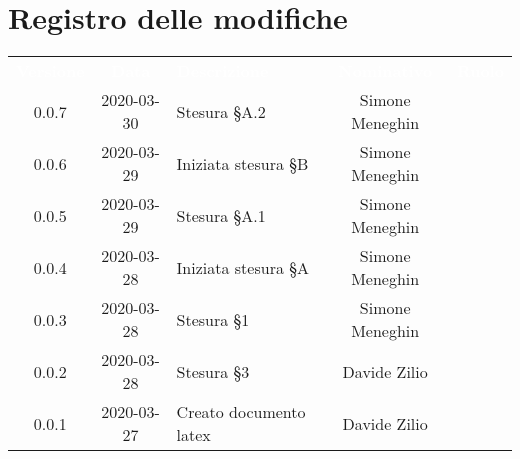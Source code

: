 \section*{Registro delle modifiche}
{
	\centering
	\begin{longtable}{ c c  C{4cm}  c  c }
		\textcolor{white}{\textbf{Versione}} & \textcolor{white}{\textbf{Data}} & \textcolor{white}{\textbf{Descrizione}} & \textcolor{white}{\textbf{Nominativo}} & \textcolor{white}{\textbf{Ruolo}}\\		
		
		0.0.7 & 2020-03-30 & Stesura \S A.2 & Simone Meneghin &\reda{} \\
		0.0.6 & 2020-03-29 & Iniziata stesura \S B & Simone Meneghin &\reda{} \\
		0.0.5 & 2020-03-29 & Stesura \S A.1 & Simone Meneghin &\reda{} \\
		0.0.4 & 2020-03-28 & Iniziata stesura \S A & Simone Meneghin &\reda{} \\
		0.0.3 & 2020-03-28 & Stesura \S 1 & Simone Meneghin &\reda{} \\
		0.0.2 & 2020-03-28 & Stesura \S 3 & Davide Zilio &\reda{} \\
		0.0.1 & 2020-03-27 & Creato documento latex & Davide Zilio &\reda{}\\		
		
	\end{longtable}

}